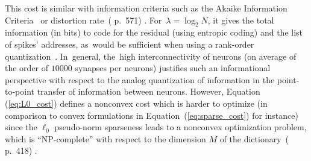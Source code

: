 \documentclass[vision,article,accept,oneauthor,pdftex]{Definitions/mdpi}
\newcommand{\seeEq}[1]{Eq.~\ref{eq:#1}}%
\begin{document}
This cost is similar with information criteria such as the Akaike Information Criteria~\citep{Akaike74} or distortion rate~(\cite{Mallat98} p.~571) %
. For~$\lambda=\log_2 N$, it gives the total information (in bits) to code for the residual (using entropic coding) and the list of spikes' addresses, as~would be sufficient when using a rank-order quantization~\citep{Perrinet03ieee}. In~general, the~high interconnectivity of neurons (on average of the order of $10000$ synapses per neurons) justifies such an informational perspective with respect to the analog quantization of information in the point-to-point transfer of information between neurons.
However, Equation (\ref{eq:L0_cost}) defines a nonconvex cost which is harder to optimize (in comparison to convex formulations in Equation~(\ref{eq:sparse_cost}) for instance) since the $\ell_0$ pseudo-norm sparseness leads to a nonconvex optimization problem, which is ``NP-complete'' with respect to the dimension $M$ of the dictionary~(\cite{Mallat98}~ p.~418) .

\end{document}
